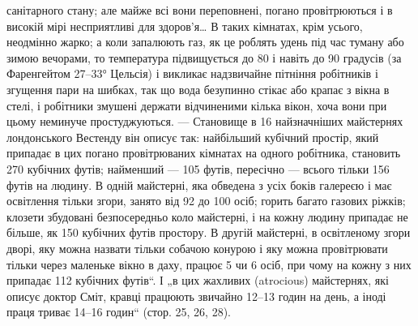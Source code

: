 \parcont{}  %
санітарного стану; але майже всі вони переповнені, погано провітрюються і в високій мірі
несприятливі для здоров’я\dots{} В таких
кімнатах, крім усього, неодмінно жарко; а коли запалюють газ,
як це роблять удень під час туману або зимою вечорами, то температура підвищується до 80 і навіть до
90 градусів (за Фаренгейтом \deq{} 27--33° Цельсія) і викликає надзвичайне пітніння робітників
і згущення пари на шибках, так що вода безупинно стікає або
крапає з вікна в стелі, і робітники змушені держати відчиненими
кілька вікон, хоча вони при цьому неминуче простуджуються. —
Становище в 16 найзначніших майстернях лондонського Вестенду
він описує так: найбільший кубічний простір, який припадає
в цих погано провітрюваних кімнатах на одного робітника, становить 270 кубічних футів; найменший —
105 футів, пересічно —
всього тільки 156 футів на людину. В одній майстерні, яка обведена з усіх боків галереєю і має
освітлення тільки згори,
занято від 92 до 100 осіб; горить багато газових ріжків; клозети
збудовані безпосередньо коло майстерні, і на кожну людину
припадає не більше, як 150 кубічних футів простору. В другій
майстерні, в освітленому згори дворі, яку можна назвати тільки
собачою конурою і яку можна провітрювати тільки через маленьке вікно в даху, працює 5 чи 6 осіб, при
чому на кожну
з них припадає 112 кубічних футів“. І „в цих жахливих (atrocious) майстернях, які описує доктор
Сміт, кравці працюють
звичайно 12--13 годин на день, а іноді праця триває 14--16 годин“ (стор. 25, 26, 28).

